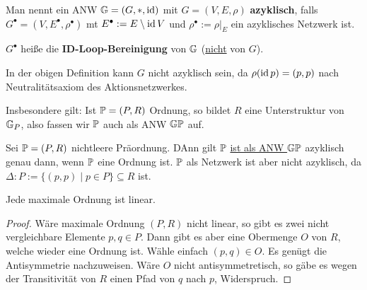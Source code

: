 \begin{definition}
    Man nennt ein ANW $\G = (G, \ast, \id)$ mit $G=(V,E,\rho)$ \textbf{azyklisch}, falls 
    $G^\bullet =(V,E^\bullet, \rho^\bullet)$ mt $E^\bullet := E \setminus \id V$ und $\rho^\bullet := \rho|_E$
    ein azyklisches Netzwerk ist.

    $G^\bullet$ heiße die \textbf{ID-Loop-Bereinigung} von $\G$ (\underline{nicht} von $G$).
\end{definition}

\begin{bemerkungnr}
    In der obigen Definition kann $G$ nicht azyklisch sein, da $\rho(\id p) = (p,p)$ nach Neutralitätsaxiom des Aktionsnetzwerkes.
\end{bemerkungnr}

\begin{bemerkungnr}
    Insbesondere gilt: Ist $\P = (P,R)$ Ordnung, so bildet $R$ eine Unterstruktur von $\G_P$, 
    also fassen wir $\P$ auch als ANW $\G\P$ auf.
\end{bemerkungnr}

\begin{beispiel}
    Sei $\P=(P,R)$ nichtleere Präordnung. DAnn gilt $\P$ \underline{ist als ANW $\G\P$} azyklisch genau
    dann, wenn $\P$ eine Ordnung ist. $\P$ als Netzwerk ist aber nicht azyklisch, da 
    $\Delta:P := \{(p,p) \mid p \in P\} \subseteq R$ ist.
\end{beispiel}

\begin{satz}
    Jede maximale Ordnung ist linear.
\end{satz}
\begin{proof}
    Wäre maximale Ordnung $(P,R)$ nicht linear, so gibt es zwei nicht vergleichbare Elemente $p,q \in P$.
    Dann gibt es aber eine Obermenge $O$ von $R$, welche wieder eine Ordnung ist.
    Wähle einfach $(p,q) \in O$. 
    Es genügt die Antisymmetrie nachzuweisen.
    Wäre $O$ nicht antisymmetretisch, so gäbe es wegen der Transitivität von $R$ einen Pfad von $q$ nach $p$, Widerspruch.
\end{proof}
